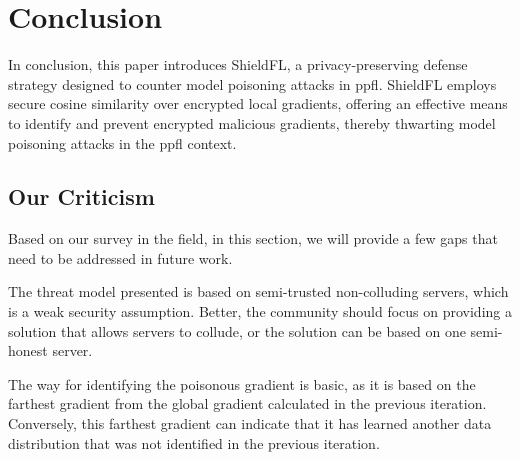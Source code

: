 \section{Conclusion}
\label{sec:conclusion}

In conclusion, this paper introduces ShieldFL, a privacy-preserving defense strategy designed to counter model poisoning attacks in \ac{ppfl}.
ShieldFL employs secure cosine similarity over encrypted local gradients, offering an effective means to identify and prevent encrypted malicious gradients, thereby thwarting model poisoning attacks in the \ac{ppfl} context. 

\subsection{Our Criticism}

Based on our survey in the field, in this section, we will provide a few gaps that need to be addressed in future work.
\begin{enumerate*}
    \item The threat model presented is based on semi-trusted non-colluding servers, which is a weak security assumption.
    Better, the community should focus on providing a solution that allows servers to collude, or the solution can be based on one semi-honest server.
    \item The way for identifying the poisonous gradient is basic, as it is based on the farthest gradient from the global gradient calculated in the previous iteration.
    Conversely, this farthest gradient can indicate that it has learned another data distribution that was not identified in the previous iteration.
\end{enumerate*}
